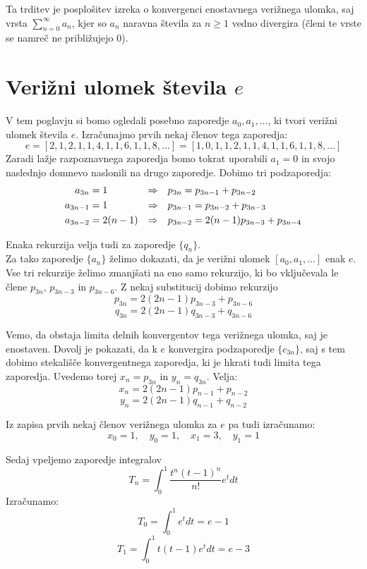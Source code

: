 \documentclass[a4paper,12pt]{article}
\theoremstyle{definition}
\theoremstyle{proposition}
\theoremstyle{theorem}
\theoremstyle{lemma}
\begin{document}
Ta trditev je posplošitev izreka o konvergenci enostavnega verižnega ulomka, saj vrsta $\sum_{n=0}^{\infty}a_n$, kjer so $a_n$ naravna števila za $n \geq 1$ vedno divergira (členi te vrste se namreč ne približujejo $0$).

\section{Verižni ulomek števila $e$} \label{euler}

V tem poglavju si bomo ogledali posebno zaporedje $a_0,a_1,...$, ki tvori verižni ulomek števila $e$. Izračunajmo prvih nekaj členov tega zaporedja:
\[e = [2, 1, 2, 1, 1, 4, 1, 1, 6, 1, 1, 8, ...] = [1, 0, 1, 1, 2, 1, 1, 4, 1, 1, 6, 1, 1, 8, ...] \]
Zaradi lažje razpoznavnega zaporedja bomo tokrat uporabili $a_1=0$ in svojo naslednjo domnevo naslonili na drugo zaporedje. Dobimo tri podzaporedja:
\begin{align*}
a_{3n} &= 1 &\Rightarrow \quad & p_{3n} = p_{3n-1}+p_{3n-2} \hfill \\
a_{3n-1} &= 1 &\Rightarrow \quad & p_{3n-1} = p_{3n-2}+p_{3n-3} \hfill \\
a_{3n-2} &= 2(n-1) &\Rightarrow \quad & p_{3n-2} = 2(n-1)p_{3n-3}+p_{3n-4} \hfill \\
\end{align*}

Enaka rekurzija velja tudi za zaporedje $\{q_n\}$.\\
Za tako zaporedje $\{a_n\}$ želimo dokazati, da je verižni ulomek $[a_0, a_1,...]$ enak $e$.\\ Vse tri rekurzije želimo zmanjšati na eno samo rekurzijo, ki bo vključevala le člene $p_{3n}$, $p_{3n-3}$ in $p_{3n-6}$. Z nekaj substitucij dobimo rekurzijo
\[ p_{3n} = 2(2n-1)p_{3n-3}+p_{3n-6} \]
\[ q_{3n} = 2(2n-1)q_{3n-3}+q_{3n-6} \]

Vemo, da obstaja limita delnih konvergentov tega verižnega ulomka, saj je enostaven. Dovolj je pokazati, da k $e$ konvergira podzaporedje $\{c_{3n}\}$, saj s tem dobimo stekališče konvergentnega zaporedja, ki je hkrati tudi limita tega zaporedja. Uvedemo torej $x_n = p_{3n}$ in $y_n = q_{3n}$. Velja:
\[ x_n = 2(2n-1)p_{n-1}+p_{n-2} \]
\[ y_n = 2(2n-1)q_{n-1}+q_{n-2} \]

Iz zapisa prvih nekaj členov verižnega ulomka za $e$ pa tudi izračunamo:
\[ x_0 = 1,\quad y_0=1,\quad x_1=3,\quad y_1=1\]

Sedaj vpeljemo zaporedje integralov $$T_n = \int_{0}^{1}\frac{t^n(t-1)^n}{n!}e^t dt$$
Izračunamo:
$$T_0 = \int_{0}^{1}e^t dt = e -1$$
$$T_1 = \int_{0}^{1}t(t-1)e^t dt=e-3$$
\end{document}
